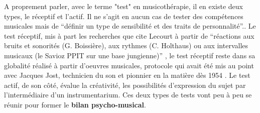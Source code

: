          A proprement parler, avec le terme "test" en musicothérapie, il en existe deux types, le réceptif et l'actif. Il ne s'agit en aucun cas de tester des compétences musicales mais de \enquote {définir un type de sensibilité et des traits de personnalité}.\autocite[83]{lecourt_les_2017}.
Le test réceptif, mis à part les recherches que cite Lecourt à partir de \enquote {réactions aux bruits et sonorités (G. Boissière), aux rythmes (C. Holthaus) ou aux intervalles musicaux (le Savioz PPIT sur une base jungienne)} \autocite[83]{lecourt_les_2017}, le test réceptif reste dans sa globalité réalisé à partir d'oeuvres musicales, protocole qui avait été mis au point avec Jacques Jost, technicien du son et pionnier en la matière dès 1954 \autocite{Jost}.
         Le test actif, de son côté, évalue la créativité, les possibilités d'expression du sujet par l'intermédiaire d'un instrumentarium. Ces deux types  de tests vont peu à peu se réunir pour former
                 le \textbf{ bilan
                     psycho-musical}.


